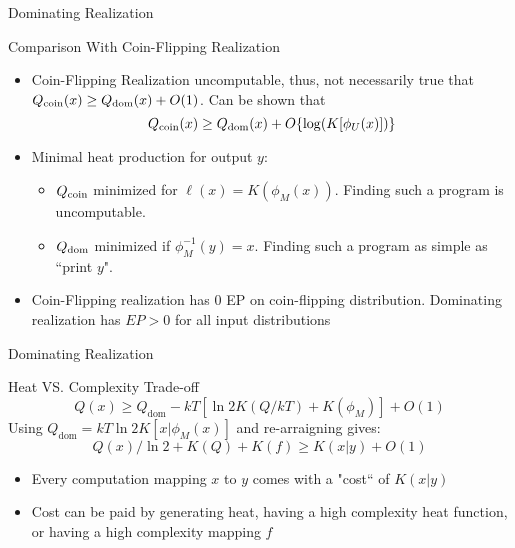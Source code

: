 \begin{frame}{Dominating Realization}
\begin{block}{Comparison With Coin-Flipping Realization}
\begin{itemize}
	\item Coin-Flipping Realization uncomputable, thus, not necessarily true that $Q_{\text{coin}}(x) \ge Q_{\text{dom}}(x) + O(1)$. Can be shown that
	\begin{equation*}
	Q_{\text{coin}}(x) \ge Q_{\text{dom}}(x) + O\{\log(K[\phi_U(x)])\}
	\end{equation*}
	\item Minimal heat production for output $y$:
	\begin{itemize}
		\item $Q_{\text{coin}}$ minimized for $\ell(x) = K(\phi_M(x))$. Finding such a program is uncomputable.
		\item $Q_{\text{dom}}$ minimized if $\phi_M^{-1}(y) = x$. Finding such a program as simple as ``print $y$".
	\end{itemize}
	\item Coin-Flipping realization has 0 EP on coin-flipping distribution. Dominating realization has $EP > 0 $ for all input distributions
\end{itemize}
\end{block}
\end{frame}

\begin{frame}{Dominating Realization}
\begin{block}{Heat VS. Complexity Trade-off}
     \begin{equation*}
        Q(x) \ge Q_\text{dom} - kT[\ln 2K(Q/kT) + K(\phi_M)] + O(1)
    \end{equation*}
    Using $Q_\text{dom} = kT\ln 2K[x|\phi_M(x)]$ and re-arraigning gives:
    \begin{equation*}
        Q(x)/\ln 2 + K(Q) + K(f) \ge K(x|y) + O(1)
    \end{equation*}
    \begin{itemize}
        \item Every computation mapping $x$ to $y$ comes with a "cost`` of $K(x|y)$
        \item Cost can be paid by generating heat, having a high complexity heat function, or having a high complexity mapping $f$
    \end{itemize}
\end{block}
\end{frame}

